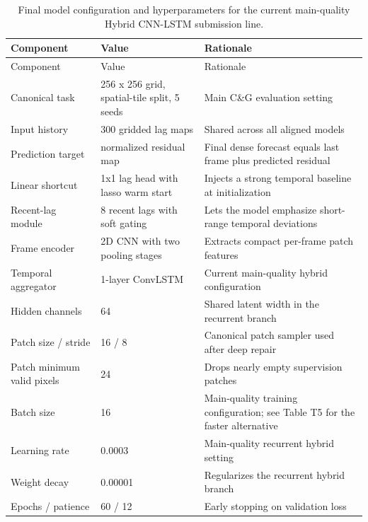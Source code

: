 \documentclass[11pt]{article}
\begin{document}
\begin{landscape}
\end{landscape}

\begin{longtable}{p{3.2cm}p{3.5cm}p{7.0cm}}
\caption{Final model configuration and hyperparameters for the current main-quality Hybrid CNN-LSTM submission line.}\label{tab:t4}\\
\toprule
Component & Value & Rationale \\
\midrule
\endfirsthead
\toprule
Component & Value & Rationale \\
\midrule
\endhead
Canonical task & 256 x 256 grid, spatial-tile split, 5 seeds & Main C\&G evaluation setting \\
Input history & 300 gridded lag maps & Shared across all aligned models \\
Prediction target & normalized residual map & Final dense forecast equals last frame plus predicted residual \\
Linear shortcut & 1x1 lag head with lasso warm start & Injects a strong temporal baseline at initialization \\
Recent-lag module & 8 recent lags with soft gating & Lets the model emphasize short-range temporal deviations \\
Frame encoder & 2D CNN with two pooling stages & Extracts compact per-frame patch features \\
Temporal aggregator & 1-layer ConvLSTM & Current main-quality hybrid configuration \\
Hidden channels & 64 & Shared latent width in the recurrent branch \\
Patch size / stride & 16 / 8 & Canonical patch sampler used after deep repair \\
Patch minimum valid pixels & 24 & Drops nearly empty supervision patches \\
Batch size & 16 & Main-quality training configuration; see Table T5 for the faster alternative \\
Learning rate & 0.0003 & Main-quality recurrent hybrid setting \\
Weight decay & 0.00001 & Regularizes the recurrent hybrid branch \\
Epochs / patience & 60 / 12 & Early stopping on validation loss \\
\bottomrule
\end{longtable}
\end{document}
